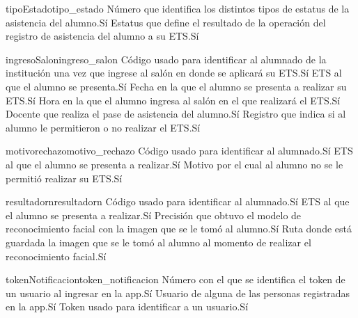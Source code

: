 \begin{cdtEntidad}{tipoEstado}{tipo\_estado}
	{Número que identifica los distintos tipos de estatus de la asistencia del alumno.}{Sí}
	{Estatus que define el resultado de la operación del registro de asistencia del alumno a su ETS.}{Sí}
\end{cdtEntidad}
\begin{cdtEntidad}{ingresoSalon}{ingreso\_salon}
	{Código usado para identificar al alumnado de la institución una vez que ingrese al salón en donde se aplicará su ETS.}{Sí}
	{ETS al que el alumno se presenta.}{Sí}
	{Fecha en la que el alumno se presenta a realizar su ETS.}{Sí}
	{Hora en la que el alumno ingresa al salón en el que realizará el ETS.}{Sí}
	{Docente que realiza el pase de asistencia del alumno.}{Sí}
	{Registro que indica si al alumno le permitieron o no realizar el ETS.}{Sí}
\end{cdtEntidad}
\begin{cdtEntidad}{motivorechazo}{motivo\_rechazo}
	{Código usado para identificar al alumnado.}{Sí}
	{ETS al que el alumno se presenta a realizar.}{Sí}
	{Motivo por el cual al alumno no se le permitió realizar su ETS.}{Sí}
\end{cdtEntidad}
\begin{cdtEntidad}{resultadorn}{resultadorn}
	{Código usado para identificar al alumnado.}{Sí}
	{ETS al que el alumno se presenta a realizar.}{Sí}
	{Precisión que obtuvo el modelo de reconocimiento facial con la imagen que se le tomó al alumno.}{Sí}
	{Ruta donde está guardada la imagen que se le tomó al alumno al momento de realizar el reconocimiento facial.}{Sí}
\end{cdtEntidad}
\begin{cdtEntidad}{tokenNotificacion}{token\_notificacion}
	{Número con el que se identifica el token de un usuario al ingresar en la app.}{Sí}
	{Usuario de alguna de las personas registradas en la app.}{Sí}
	{Token usado para identificar a un usuario.}{Sí}
\end{cdtEntidad}

